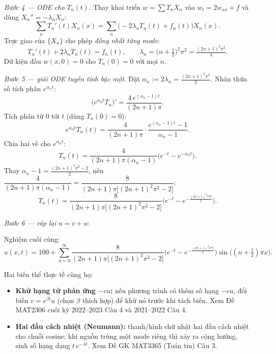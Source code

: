\emph{Bước 4 --- ODE cho $T_n(t)$.} Thay khai triển $w=\sum T_n X_n$ vào $w_t=2w_{xx}+f$ và dùng $X_n''=-\lambda_n X_n$:
\[
\sum_n T_n'(t)X_n(x)=\sum_n\big(-2\lambda_n T_n(t)+f_n(t)\big)X_n(x).
\]
Trực giao của $\{X_n\}$ cho phép \emph{đồng nhất từng mode}:
\[
T_n'(t)+2\lambda_n T_n(t)=f_n(t),\qquad \lambda_n=\big(n+\tfrac12\big)^2\pi^2=\tfrac{(2n+1)^2\pi^2}{4}.
\]
Dữ kiện đầu $w(x,0)=0$ cho $T_n(0)=0$ với mọi $n$.

\emph{Bước 5 --- giải ODE tuyến tính bậc một.} Đặt $\alpha_n:=2\lambda_n=\tfrac{(2n+1)^2\pi^2}{2}$. Nhân thừa số tích phân $e^{\alpha_n t}$:
\[
\big(e^{\alpha_n t}T_n\big)'=\frac{4\,e^{(\alpha_n-1)t}}{(2n+1)\pi}.
\]
Tích phân từ $0$ tới $t$ (dùng $T_n(0)=0$):
\[
e^{\alpha_n t}T_n(t)=\frac{4}{(2n+1)\pi}\cdot\frac{e^{(\alpha_n-1)t}-1}{\alpha_n-1}.
\]
Chia hai vế cho $e^{\alpha_n t}$:
\[
T_n(t)=\frac{4}{(2n+1)\pi(\alpha_n-1)}\big(e^{-t}-e^{-\alpha_n t}\big).
\]
Thay $\alpha_n-1=\tfrac{(2n+1)^2\pi^2-2}{2}$, nên $\dfrac{4}{(2n+1)\pi(\alpha_n-1)}=\dfrac{8}{(2n+1)\pi\big[(2n+1)^2\pi^2-2\big]}$:
\[
T_n(t)=\frac{8}{(2n+1)\pi\big[(2n+1)^2\pi^2-2\big]}\Big(e^{-t}-e^{-\frac{(2n+1)^2\pi^2 t}{2}}\Big).
\]

\emph{Bước 6 --- ráp lại $u=v+w$.}

\begin{nhobox}
Nghiệm cuối cùng:
\[
u(x,t)=100+\sum_{n=0}^{\infty}
\frac{8}{(2n+1)\pi\big[(2n+1)^2\pi^2-2\big]}
\Big(e^{-t}-e^{-\frac{(2n+1)^2\pi^2 t}{2}}\Big)
\sin\!\big((n+\tfrac12)\pi x\big).
\]
\end{nhobox}

\begin{luuybox}
Hai biến thể thực tế cùng họ:
\begin{itemize}
\item \textbf{Khử hạng tử phản ứng $-cu$:} nếu phương trình có thêm số hạng $-cu$, đổi biến $v = e^{\beta t}u$ (chọn $\beta$ thích hợp) để khử nó trước khi tách biến. Xem Đề MAT2306 cuối kỳ 2022--2023 Câu 4 và 2021--2022 Câu 4.
\item \textbf{Hai đầu cách nhiệt (Neumann):} thanh/hình chữ nhật hai đầu cách nhiệt cho chuỗi cosine; khi nguồn trùng một mode riêng thì xảy ra cộng hưởng, sinh số hạng dạng $t\,e^{-\lambda t}$. Xem Đề GK MAT3365 (Toán tin) Câu 3.
\end{itemize}
\end{luuybox}
